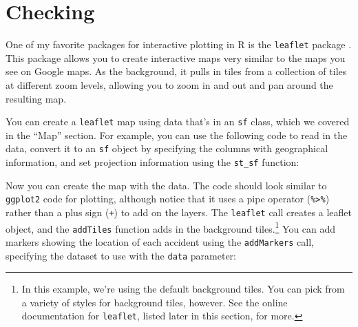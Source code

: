 \documentclass[]{tufte-book}
\newenvironment{Shaded}{}{}
\newcommand{\DataTypeTok}[1]{\textcolor[rgb]{0.56,0.13,0.00}{#1}}
\newcommand{\DecValTok}[1]{\textcolor[rgb]{0.25,0.63,0.44}{#1}}
\newcommand{\KeywordTok}[1]{\textcolor[rgb]{0.00,0.44,0.13}{\textbf{#1}}}
\newcommand{\NormalTok}[1]{#1}
\newcommand{\OperatorTok}[1]{\textcolor[rgb]{0.40,0.40,0.40}{#1}}
\newcommand{\StringTok}[1]{\textcolor[rgb]{0.25,0.44,0.63}{#1}}
\begin{document}
\hypertarget{checking}{%
\section{Checking}\label{checking}}

One of my favorite packages for interactive plotting in R is the \texttt{leaflet} package \citep{R-leaflet}.
This package allows you to create interactive maps very similar to the maps you see on Google maps.
As the background, it pulls in tiles from a collection of tiles at different zoom levels, allowing
you to zoom in and out and pan around the resulting map.

You can create a \texttt{leaflet} map using data that's in an \texttt{sf} class, which we covered in the ``Map''
section. For example, you can use the following code to read in the data, convert it to an \texttt{sf}
object by specifying the columns with geographical information, and set projection information
using the \texttt{st\_sf} function:

\begin{Shaded}
\end{Shaded}

Now you can create the map with the data. The code should look similar to \texttt{ggplot2} code for
plotting, although notice that it uses a pipe operator (\texttt{\%\textgreater{}\%}) rather than a plus sign (\texttt{+}) to
add on the layers. The \texttt{leaflet} call creates a leaflet object, and the \texttt{addTiles} function adds in
the background tiles.\footnote{In this example, we're using the default background tiles. You can pick from
  a variety of styles for background tiles, however. See the online documentation for \texttt{leaflet},
  listed later in this section, for more.} You can add markers showing the location of each accident
using the \texttt{addMarkers} call, specifying the dataset to use with the \texttt{data} parameter:

\begin{Shaded}
\end{Shaded}
\end{document}
